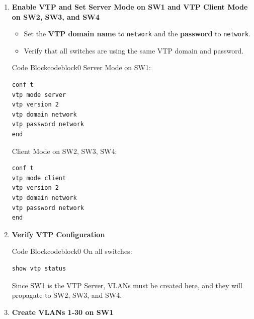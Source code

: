 \documentclass[a4paper]{book}
\begin{document}
\begin{enumerate}
	\item \textbf{Enable VTP and Set Server Mode on SW1 and VTP Client Mode on SW2, SW3, and SW4}
	      \begin{itemize}
		      \item Set the \textbf{VTP domain name} to \texttt{network} and the \textbf{password} to \texttt{network}.
		      \item Verify that all switches are using the same VTP domain and password.
	      \end{itemize}



	      \begin{ocg}{Code Block}{codeblock}{0}
		      \vspace{0.5cm}
		      Server Mode on SW1:
		      \begin{lstlisting}
conf t
vtp mode server
vtp version 2
vtp domain network
vtp password network
end
    \end{lstlisting}



		      Client Mode on SW2, SW3, SW4:
		      \begin{lstlisting}
conf t
vtp mode client
vtp version 2
vtp domain network
vtp password network
end
\end{lstlisting}
	      \end{ocg}


	\item \textbf{Verify VTP Configuration}



	      \begin{ocg}{Code Block}{codeblock}{0}
		      \vspace{0.5cm}
		      On all switches:
		      \begin{lstlisting}
show vtp status
        \end{lstlisting}
	      \end{ocg}

	      \vspace{1cm}

	      Since SW1 is the VTP Server, VLANs must be created here, and they will propagate to SW2, SW3, and SW4.
	\item \textbf{Create VLANs 1-30 on SW1}


\end{enumerate}
\end{document}
